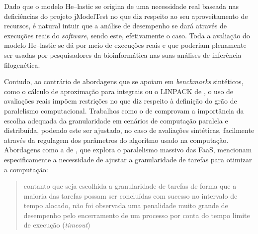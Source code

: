 \documentclass[english,brazilian]{UNISINOSmonografia} %
\begin{document}
Dado que o modelo \textsf{He}--lastic se origina de uma necessidade real baseada nas deficiências do projeto jModelTest no que diz respeito ao seu aproveitamento de recursos, é natural intuir que a análise de desempenho se dará através de execuções reais do \textit{software}, sendo este, efetivamente o caso.
Toda a avaliação do modelo \textsf{He}--lastic se dá por meio de execuções reais e que poderiam plenamente ser usadas por pesquisadores da bioinformática nas suas análises de inferência filogenética.


Contudo, ao contrário de abordagens que se apoiam em \textit{benchmarks} sintéticos, como o cálculo de aproximação para integrais ou o LINPACK de , o uso de avaliações reais impõem restrições no que diz respeito à definição do grão de paralelismo computacional.
Trabalhos como o de  comprovam a importância da escolha adequada da granularidade em cenários de computação paralela e distribuída, podendo este ser ajustado, no caso de avaliações sintéticas, facilmente através da regulagem dos parâmetros do algoritmo usado na computação.
Abordagens como a de , que explora o paralelismo massivo das FaaS, mencionam especificamente a necessidade de ajustar a granularidade de tarefas para otimizar a computação:
\begin{quote}
	contanto que seja escolhida a granularidade de tarefas de forma que a maioria das tarefas possam ser concluídas com sucesso no intervalo de tempo alocado, não foi observada uma penalidade muito grande de desempenho pelo encerramento de um processo por conta do tempo limite de execução (\textit{timeout})
\end{quote}
\end{document}
